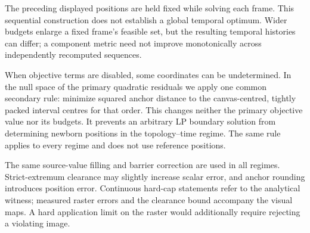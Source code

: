 The preceding displayed positions are held fixed while solving each frame. This sequential construction does not establish a global temporal optimum. Wider budgets enlarge a fixed frame's feasible set, but the resulting temporal histories can differ; a component metric need not improve monotonically across independently recomputed sequences.

When objective terms are disabled, some coordinates can be undetermined. In the null space of the primary quadratic residuals we apply one common secondary rule: minimize squared anchor distance to the canvas-centred, tightly packed interval centres for that order. This changes neither the primary objective value nor its budgets. It prevents an arbitrary LP boundary solution from determining newborn positions in the topology--time regime. The same rule applies to every regime and does not use reference positions.

The same source-value filling and barrier correction are used in all regimes. Strict-extremum clearance may slightly increase scalar error, and anchor rounding introduces position error. Continuous hard-cap statements refer to the analytical witness; measured raster errors and the clearance bound accompany the visual maps. A hard application limit on the raster would additionally require rejecting a violating image.
